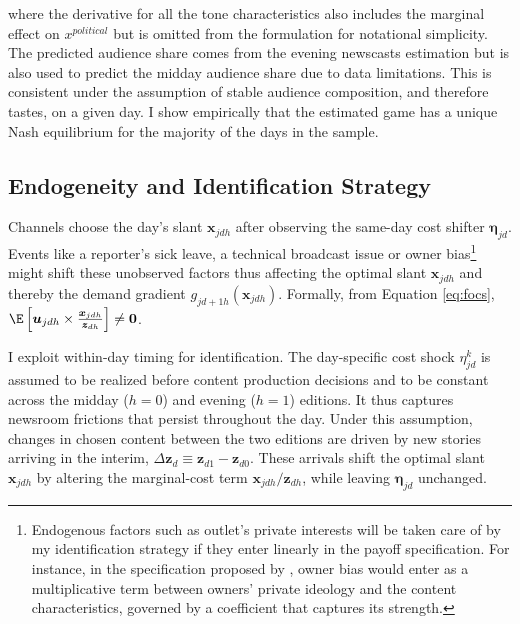\documentclass[12pt]{article}
\begin{document}
where the derivative for all the tone characteristics also includes the marginal effect on $x^{political}$ but is omitted from the formulation for notational simplicity. The predicted audience share comes from the evening newscasts estimation but is also used to predict the midday audience share due to data limitations. This is consistent under the assumption of stable audience composition, and therefore tastes, on a given day. I show empirically that the estimated game has a unique Nash equilibrium for the majority of the days in the sample. 



\subsection{Endogeneity and Identification Strategy}


Channels choose the day’s slant \(\mathbf{x}_{jdh}\) after observing the same-day cost shifter \(\bm\eta_{jd}\). Events like a reporter's sick leave, a technical broadcast issue or owner bias\footnote{Endogenous factors  such as outlet's private interests will be taken care of by my identification strategy if they enter linearly in the payoff specification. For instance, in the specification proposed by  \cite[][]{Anderson2010MediaMA}, owner bias would enter as a multiplicative term between owners' private ideology and the content characteristics, governed by a coefficient that captures its strength.} might shift these unobserved factors  thus affecting the optimal slant \(\mathbf{x}_{jdh}\) and thereby the demand gradient \(g_{jd+1h}(\mathbf{x}_{jdh})\).  Formally, from Equation \eqref{eq:focs},  $\E\left[\bm{u}_{jdh}\times \frac{\bm{x}_{jdh}}{\bm{z}_{dh}}\right]\neq \bm{0}$.





I exploit within-day timing for identification. The day-specific cost shock $\eta_{jd}^k$ is assumed to be realized before content production decisions and to be constant across the midday ($h=0$) and evening ($h=1$) editions. It thus captures newsroom frictions that persist throughout the day. Under this assumption, changes in chosen content between the two editions are driven by new stories arriving in the interim, $\Delta \bm{z}_d \equiv \bm{z}_{d1}-\bm{z}_{d0}$. These arrivals shift the optimal slant $\mathbf{x}_{jdh}$ by altering the marginal-cost term $\bm{x}_{jdh} / \bm{z}_{dh}$, while leaving $\bm\eta_{jd}$ unchanged.
\end{document}
